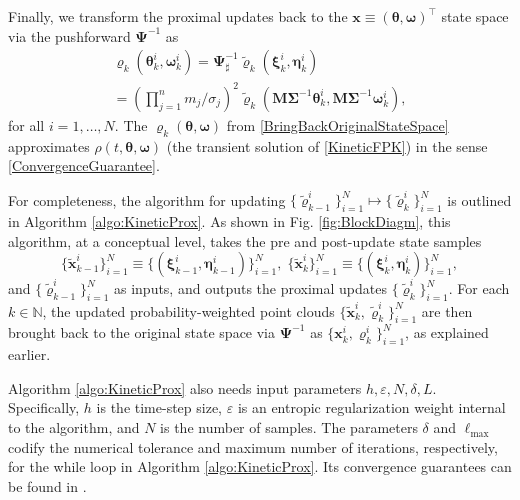 \documentclass[10pt,twocolumn]{IEEEtran}
\begin{document}
Finally, we transform the proximal updates back to the $\bm{x}\equiv\left(\bm{\theta},\bm{\omega}\right)^{\top}$ state space via the pushforward $\bm{\Psi}^{-1}$ as
\begin{multline}
\varrho_{k}\left(\bm{\theta}_{k}^{i},\bm{\omega}_{k}^{i}\right) = \bm{\Psi}^{-1}_{\sharp} \tilde{\varrho}_{k}\left(\bm{\xi}_{k}^{i},\bm{\eta}_{k}^{i}\right) \\
= \left(\prod_{j=1}^{n}m_{j}/\sigma_{j}\right)^{\!\!2}\tilde{\varrho}_{k}\left(\bm{M}\bm{\Sigma}^{-1}\bm{\theta}_{k}^{i},\bm{M}\bm{\Sigma}^{-1}\bm{\omega}_{k}^{i}\right),
\label{BringBackOriginalStateSpace}	
\end{multline}
for all $i=1,\hdots,N$. The $\varrho_{k}\left(\bm{\theta},\bm{\omega}\right)$ from \eqref{BringBackOriginalStateSpace} approximates $\rho(t,\bm{\theta},\bm{\omega})$ (the transient solution of \eqref{KineticFPK}) in the sense \eqref{ConvergenceGuarantee}. 

For completeness, the algorithm  for updating $\{\tilde{\varrho}_{k-1}^{i}\}_{i=1}^{N}\mapsto\{\tilde{\varrho}_{k}^{i}\}_{i=1}^{N}$ is outlined in Algorithm \ref{algo:KineticProx}. As shown in Fig. \ref{fig:BlockDiagm}, this algorithm, at a conceptual level, takes the pre and post-update state samples 
\[\{\tilde{\bm{x}}_{k-1}^{i}\}_{i=1}^{N}\equiv\{\left(\bm{\xi}_{k-1}^{i},\bm{\eta}_{k-1}^{i}\right)\}_{i=1}^{N}, \; \{\tilde{\bm{x}}_{k}^{i}\}_{i=1}^{N}\equiv\{\left(\bm{\xi}_{k}^{i},\bm{\eta}_{k}^{i}\right)\}_{i=1}^{N},\]
and $\{\tilde{\varrho}_{k-1}^{i}\}_{i=1}^{N}$ as inputs, and outputs the proximal updates $\{\tilde{\varrho}_{k}^{i}\}_{i=1}^{N}$. For each $k\in\mathbb{N}$, the updated probability-weighted point clouds $\{\tilde{\bm{x}}_{k}^{i},\tilde{\varrho}_{k}^{i}\}_{i=1}^{N}$ are then brought back to the original state space via $\bm{\Psi}^{-1}$ as $\{\bm{x}_{k}^{i},\varrho_{k}^{i}\}_{i=1}^{N}$, as explained earlier.


Algorithm \ref{algo:KineticProx} also needs input parameters $h,\varepsilon,N,\delta,L$. Specifically, $h$ is the time-step size, $\varepsilon$ is an entropic regularization weight internal to the  algorithm, and $N$ is the number of samples. The parameters $\delta$ and $\ell_{\max}$ codify the numerical tolerance and maximum number of iterations, respectively, for the while loop in Algorithm \ref{algo:KineticProx}. Its convergence guarantees can be found in \cite[Sec. III.C]{caluya2019TAC}.
\end{document}
